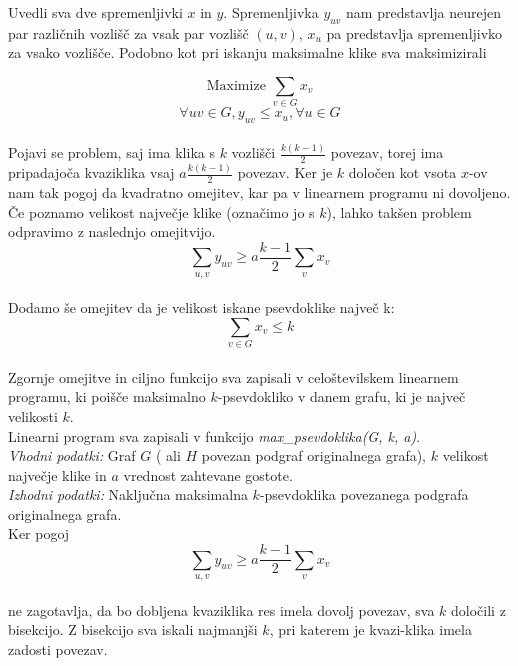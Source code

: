 \documentclass[12pt,a4paper]{amsart}
\theoremstyle{definition}
\theoremstyle{plain}
\begin{document}
\begin{itemize}
Uvedli sva dve spremenljivki $x$ in $y$. Spremenljivka $y_{uv}$ nam predstavlja neurejen par različnih vozlišč za vsak par vozlišč $(u,v)$, $x_u$ pa predstavlja spremenljivko za vsako vozlišče. Podobno kot pri iskanju maksimalne klike sva maksimizirali

 $$\text{Maximize }\sum_{v\in G}x_v$$ $$\forall uv \in G,  y_{uv} \leqslant x_u, \forall u \in G$$\\
 
Pojavi se problem, saj ima klika s $k$ vozlišči $\frac{k(k-1)}{2}$ povezav, torej ima pripadajoča kvaziklika vsaj $a \frac{ k(k-1)}{2}$ povezav. Ker je $k$ določen kot vsota $x$-ov nam tak pogoj da kvadratno omejitev, kar pa v linearnem programu ni dovoljeno. Če poznamo velikost največje klike (označimo jo s $k$), lahko takšen problem odpravimo z naslednjo omejitvijo.\\
 
 $$ \sum_{u, v} y_{uv} \geqslant a   \frac{k-1}{2}  \sum_v x_v$$ \\
 
 Dodamo še omejitev da je velikost iskane psevdoklike največ k:
 $$\sum_{v \in G} x_v \leqslant k$$\\

Zgornje omejitve in ciljno funkcijo sva zapisali v celoštevilskem linearnem programu, ki poišče maksimalno $k$-psevdokliko v danem grafu, ki je največ velikosti $k$. \\

Linearni program sva zapisali v funkcijo \textit{max\_psevdoklika(G, k, a)}.
\\

\textit{Vhodni podatki:} Graf $G$ ( ali $H$ povezan podgraf originalnega grafa), $k$ velikost največje klike in $a$ vrednost zahtevane gostote.
\\

\textit{Izhodni podatki:} Naključna maksimalna $k$-psevdoklika povezanega podgrafa originalnega grafa.
\\

 Ker  pogoj \\
  $$ \sum_{u, v} y_{uv} \geqslant a   \frac{k-1}{2}  \sum_v x_v$$ \\
ne zagotavlja, da bo dobljena kvaziklika res imela dovolj povezav, sva $k$ določili z bisekcijo. Z bisekcijo sva iskali najmanjši $k$, pri katerem je kvazi-klika imela zadosti povezav. 
\\


\end{itemize}
\end{document}

